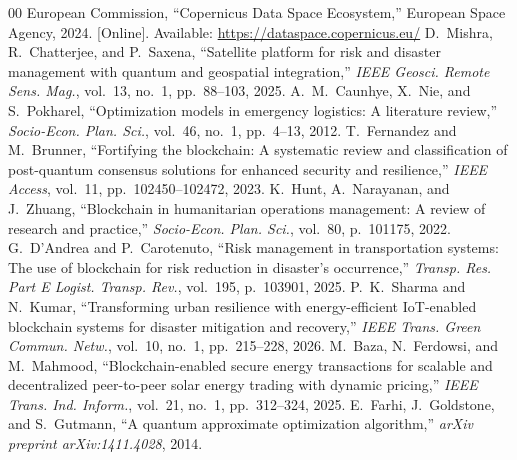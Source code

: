 \documentclass[conference]{IEEEtran}
\begin{document}
\begin{thebibliography}{00}
 European Commission, ``Copernicus Data Space Ecosystem,'' European Space Agency, 2024. [Online]. Available: \url{https://dataspace.copernicus.eu/}
 D.~Mishra, R.~Chatterjee, and P.~Saxena, ``Satellite platform for risk and disaster management with quantum and geospatial integration,'' \emph{IEEE Geosci. Remote Sens. Mag.}, vol.~13, no.~1, pp.~88--103, 2025.
 A.~M.~Caunhye, X.~Nie, and S.~Pokharel, ``Optimization models in emergency logistics: A literature review,'' \emph{Socio-Econ. Plan. Sci.}, vol.~46, no.~1, pp.~4--13, 2012.
 T.~Fernandez and M.~Brunner, ``Fortifying the blockchain: A systematic review and classification of post-quantum consensus solutions for enhanced security and resilience,'' \emph{IEEE Access}, vol.~11, pp.~102450--102472, 2023.
 K.~Hunt, A.~Narayanan, and J.~Zhuang, ``Blockchain in humanitarian operations management: A review of research and practice,'' \emph{Socio-Econ. Plan. Sci.}, vol.~80, p.~101175, 2022.
 G.~D’Andrea and P.~Carotenuto, ``Risk management in transportation systems: The use of blockchain for risk reduction in disaster’s occurrence,'' \emph{Transp. Res. Part E Logist. Transp. Rev.}, vol.~195, p.~103901, 2025.
 P.~K.~Sharma and N.~Kumar, ``Transforming urban resilience with energy-efficient IoT-enabled blockchain systems for disaster mitigation and recovery,'' \emph{IEEE Trans. Green Commun. Netw.}, vol.~10, no.~1, pp.~215--228, 2026.
 M.~Baza, N.~Ferdowsi, and M.~Mahmood, ``Blockchain-enabled secure energy transactions for scalable and decentralized peer-to-peer solar energy trading with dynamic pricing,'' \emph{IEEE Trans. Ind. Inform.}, vol.~21, no.~1, pp.~312--324, 2025.
 E.~Farhi, J.~Goldstone, and S.~Gutmann, ``A quantum approximate optimization algorithm,'' \emph{arXiv preprint arXiv:1411.4028}, 2014.
\end{thebibliography}
\end{document}
